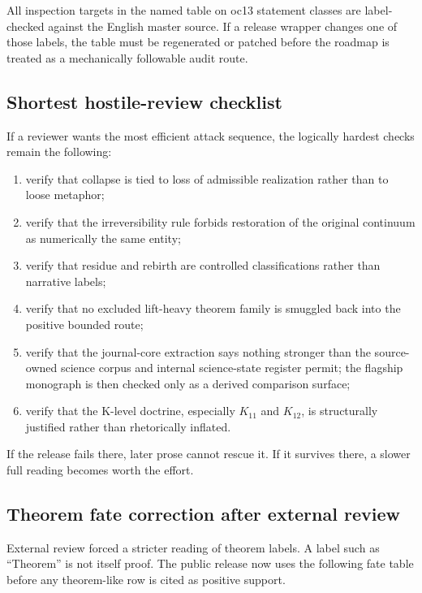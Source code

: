 All inspection targets in the named table on oc13 statement classes are
label-checked against the English master source. If a release wrapper changes
one of those labels, the table must be regenerated or patched before the
roadmap is treated as a mechanically followable audit route.

\subsection{Shortest hostile-review checklist}

If a reviewer wants the most efficient attack sequence, the logically hardest
checks remain the following:

\begin{enumerate}
\item verify that collapse is tied to loss of admissible realization rather
      than to loose metaphor;
\item verify that the irreversibility rule forbids restoration of the original
      continuum as numerically the same entity;
\item verify that residue and rebirth are controlled classifications rather
      than narrative labels;
\item verify that no excluded lift-heavy theorem family is smuggled back into
      the positive bounded route;
\item verify that the journal-core extraction says nothing stronger than the
      source-owned science corpus and internal science-state register permit; the flagship
      monograph is then checked only as a derived comparison surface;
\item verify that the K-level doctrine, especially \(K_{11}\) and \(K_{12}\),
      is structurally justified rather than rhetorically inflated.
\end{enumerate}

If the release fails there, later prose cannot rescue it. If it survives
there, a slower full reading becomes worth the effort.


\subsection{Theorem fate correction after external review}
\label{sec:oc13-theorem-fate-correction-v3}

External review forced a stricter reading of theorem labels. A label such as
``Theorem'' is not itself proof. The public release now uses the following fate
table before any theorem-like row is cited as positive support.

